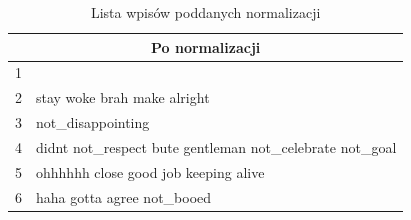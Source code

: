 \begin{table}[ht!]  
\begin{center}  
\begin{tabular}{|r|p{140mm}|}
\hline
\multicolumn{2}{|c|}{Po normalizacji}
\\ \hline
1 & 
\\ \hline
2 & stay woke brah make alright
\\ \hline
3 & not\_disappointing
\\ \hline
4 & didnt not\_respect bute gentleman not\_celebrate not\_goal
\\ \hline
5 & ohhhhhh close good job keeping alive
\\ \hline
6 & haha gotta agree not\_booed
\\
\hline
\end{tabular} 
\end{center} 
\caption{Lista wpisów poddanych normalizacji}
\label{tab:wpisy-po-normalizacja}
\end{table}

